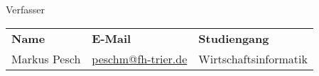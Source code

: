 \hspace{0pt}
\vfill
\LARGE{Verfasser}

\begin{table}[H]
	\label{table:verfasser}
	\normalsize
	\begin{tabular}{lll}
		\textbf{Name} 	& \textbf{E-Mail}     		& \textbf{Studiengang}	\\
		Markus Pesch 	& \url{peschm@fh-trier.de}  & Wirtschaftsinformatik	\\
	\end{tabular}
\end{table}

\hspace{0pt}
\vfill